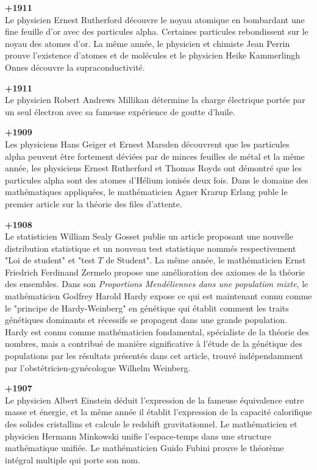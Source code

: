 \textbf{+1911}\\
Le physicien Ernest Rutherford découvre le noyau atomique en bombardant une fine feuille d'or avec des particules alpha. Certaines particules rebondissent sur le noyau des atomes d'or. La même année, le physicien et chimiste Jean Perrin prouve l'existence d'atomes et de molécules et le physicien Heike Kammerlingh Onnes découvre la supraconductivité.

\textbf{+1911}\\
Le physicien Robert Andrews Millikan détermine la charge électrique portée par un seul électron avec sa fameuse expérience de goutte d'huile.

\textbf{+1909}\\
Les physiciens Hans Geiger et Ernest Marsden découvrent que les particules alpha peuvent être fortement déviées par de minces feuilles de métal et la même année, les physiciens Ernest Rutherford et Thomas Royds ont démontré que les particules alpha sont des atomes d'Hélium ionisés deux fois. Dans le domaine des mathématiques appliquées, le mathématicien Agner Krarup Erlang puble le premier article sur la théorie des files d'attente.

\textbf{+1908}\\
Le statisticien William Sealy Gosset publie un article proposant une nouvelle distribution statistique et un nouveau test statistique nommés respectivement "Loi de student" et "test $T$ de Student". La même année, le mathématicien Ernst Friedrich Ferdinand Zermelo propose une amélioration des axiomes de la théorie des ensembles. Dans son \textit{Proportions Mendéliennes dans une population mixte}, le mathématicien Godfrey Harold Hardy expose ce qui est maintenant connu comme le "principe de Hardy-Weinberg" en génétique qui établit comment les traits génétiques dominants et récessifs se propagent dans une grande population. Hardy est connu comme mathématicien fondamental, spécialiste de la théorie des nombres, mais a contribué de manière significative à l'étude de la génétique des populations par les résultats présentés dans cet article, trouvé indépendamment par l'obstétricien-gynécologue Wilhelm Weinberg.

\textbf{+1907}\\
Le physicien Albert Einstein déduit l'expression de la fameuse équivalence entre masse et énergie, et la même année il établit l'expression de la capacité calorifique des solides cristallins et calcule le redshift gravitationnel. Le mathématicien et physicien Hermann Minkowski unifie l'espace-temps dans une structure mathématique unifiée. Le mathématicien Guido Fubini prouve le théorème intégral multiple qui porte son nom.

